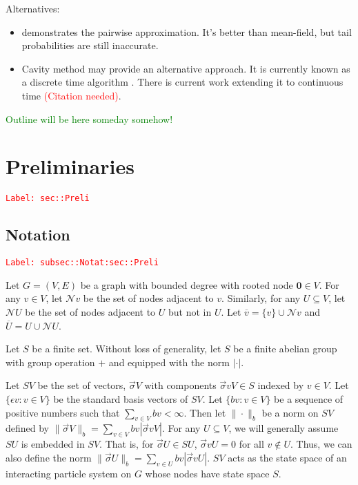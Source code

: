 \documentclass[12pt]{article}
\newcommand{\mc}{\mathcal}
\newcommand{\ov}{\overline}
\newcommand{\ep}{\epsilon}
\newcommand{\tr}{\textcolor{red}}
\newcommand{\tg}{\textcolor{green}}
\newcommand{\labe}[1]{\tr{\texttt{Label: #1}}}
\newcommand{\ind}{\hspace{24pt}}
\renewcommand{\root}{\mathbf{0}}				%
\renewcommand{\v}{v}							%
\renewcommand{\U}{U}							%
\renewcommand{\S}{S}							%
\newcommand{\s}{\sigma}							%
\newcommand{\sv}{\vec{\s}}						%
\renewcommand{\b}{b}							%
\newcommand{\ev}{\ep}							%
\newcommand{\neigh}{\mc{N}}						%
\newcommand{\cl}{\ov}							%
\begin{document}
Alternatives:

\begin{itemize}
\item \cite{Gas15} demonstrates the pairwise approximation. It's better than mean-field, but tail probabilities are still inaccurate.

\item Cavity method may provide an alternative approach. It is currently known as a discrete time algorithm \cite{Lac15}\cite{KanMon11}. There is current work extending it to continuous time \tr{(Citation needed)}.
\end{itemize}

\tg{Outline will be here someday somehow!}


\section{Preliminaries}
\label{sec::Preli}\labe{sec::Preli}

\subsection{Notation}
\label{subsec::Notat:sec::Preli}\labe{subsec::Notat:sec::Preli}

Let \(G = (V,E)\) be a graph with bounded degree with rooted node \(\root \in V\). For any \(\v \in V\), let \(\neigh{\v}\) be the set of nodes adjacent to \(\v\). Similarly, for any \(\U \subseteq V\), let \(\neigh{\U}\) be the set of nodes adjacent to \(\U\) but not in \(\U\). Let \(\cl{\v} = \{\v\}\cup\neigh{\v}\) and \(\cl{\U} = \U\cup \neigh{\U}\). 

\ind Let \(\S\) be a finite set. Without loss of generality, let \(\S\) be a finite abelian group with group operation \(+\) and equipped with the norm \(|\cdot|\). 

\ind Let \(\S{V}\) be the set of vectors, \(\sv{}{V}\) with components \(\sv{\v}{V} \in \S\) indexed by \(\v\in V\). Let \(\{\ev{\v}: \v\in V\}\) be the standard basis vectors of \(\S{V}\). Let \(\{\b{\v}:\v\in V\}\) be a sequence of positive numbers such that \(\sum_{\v\in V} \b{\v} < \infty\). Then let \(\|\cdot\|_{\b{}}\) be a norm on \(\S{V}\) defined by \(\|\sv{}{V}\|_{\b{}} = \sum_{\v\in V} \b{\v}|\sv{\v}{V}|\). For any \(\U\subseteq V\), we will generally assume \(\S{\U}\) is embedded in \(\S{V}\). That is, for \(\sv{}{\U}\in \S{\U}\), \(\sv{\v}{\U} = 0\) for all \(\v\notin\U\). Thus, we can also define the norm \(\|\sv{}{\U}\|_{\b{}} = \sum_{\v\in\U} \b{\v}|\sv{\v}{\U}|\). \(\S{V}\) acts as the state space of an interacting particle system on \(G\) whose nodes have state space \(\S\).
\end{document}
